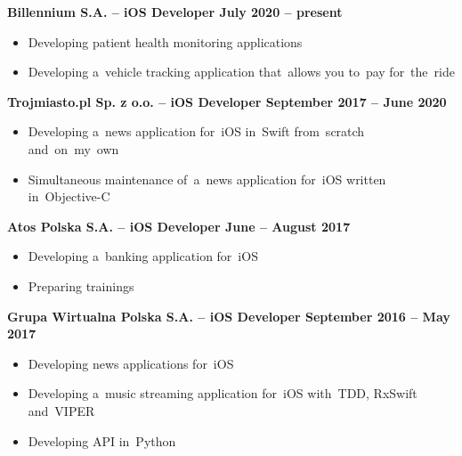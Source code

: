\documentclass[11pt,a4paper]{article}
\newcommand*\header[1]{
    \noindent\raisebox{.1cm}{\color{MidnightBlue}\rule{1.5cm}{.1cm}\hspace{.2cm}\raisebox{-.1cm}{\large\bf #1}}}
\begin{document}
    \bigskip

    \header{Experience}

    \smallskip

    {\bf Billennium S.A. -- iOS Developer \hfill July 2020 -- present}

    \vspace{-.23cm}
    \begin{itemize}[leftmargin=1.5cm] \itemsep.2mm \parskip0mm 
        \item Developing patient health monitoring applications
        \item Developing a~vehicle tracking application that~allows you to~pay for~the~ride
    \end{itemize}

    \vspace{-.17cm}

    {\bf Trojmiasto.pl Sp. z o.o. -- iOS Developer \hfill September 2017 -- June 2020}

    \vspace{-.23cm}
    \begin{itemize}[leftmargin=1.5cm] \itemsep.2mm \parskip0mm 
        \item Developing a~news application for~iOS in~Swift from~scratch and~on~my~own
        \item Simultaneous maintenance of~a~news application for~iOS written in~Objective-C
    \end{itemize}

    \vspace{-.17cm}

    {\bf Atos Polska S.A. -- iOS Developer \hfill June -- August 2017}

    \vspace{-.23cm}
    \begin{itemize}[leftmargin=1.5cm] \itemsep.2mm \parskip0mm 
        \item Developing a~banking application for~iOS
        \item Preparing trainings
    \end{itemize}

    \vspace{-.17cm}

    {\bf Grupa Wirtualna Polska S.A. -- iOS Developer \hfill September 2016 -- May 2017}

    \vspace{-.23cm}
    \begin{itemize}[leftmargin=1.5cm] \itemsep.2mm \parskip0mm 
        \item Developing news applications for~iOS
        \item Developing a~music streaming application for~iOS with~TDD, RxSwift and~VIPER
        \item Developing API in~Python
    \end{itemize}
\end{document}
